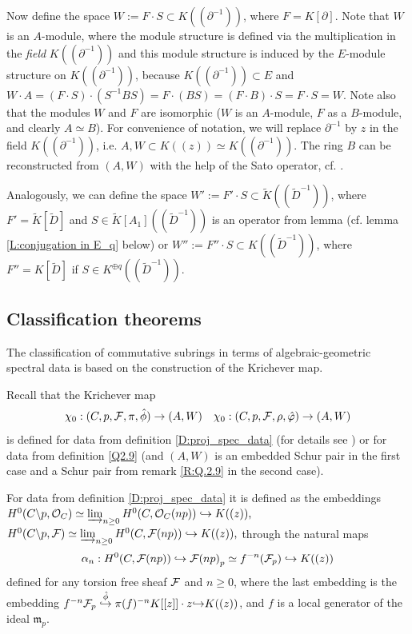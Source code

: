 \documentclass[11pt]{article}
\theoremstyle{definition}
\newcommand\limind{\mathop{\underrightarrow{\lim}}}
\newcommand{\idm}{\mathfrak{m}}
\theoremstyle{plain}
\numberwithin{equation}{section}
\newcommand{\co}{{{\cal O}}}
\newcommand{\cf}{{{\cal F}}}
\begin{document}
Now define the space $W:= F\cdot S \subset K((\partial^{-1}))$, where $F=K[\partial ]$. Note that $W$ is an $A$-module, where the module structure is defined via the multiplication in the {\it field} $K((\partial^{-1}))$ and this module structure is induced by the $E$-module structure on $K((\partial^{-1}))$, because $K((\partial^{-1}))\subset E$ and $W\cdot A=(F\cdot S)\cdot (S^{-1}BS)=F\cdot (BS)=(F\cdot B)\cdot S= F\cdot S= W$. 
Note also that the modules $W$ and $F$ are isomorphic ($W$ is an $A$-module, $F$ as a $B$-module, and clearly $A\simeq B$). For convenience of notation, we will replace $\partial^{-1}$ by $z$ in the field $K((\partial^{-1}))$, i.e. $A,W\subset K((z))\simeq K((\partial^{-1}))$. The ring $B$ can be reconstructed from $(A,W)$ with the help of the Sato operator, cf. \cite{Mu}. 

Analogously, we can define the space $W':=F'\cdot S\subset \tilde{K}((\tilde{D}^{-1}))$, where $F'=\tilde{K}[\tilde{D}]$ and $S\in \tilde{K}[A_1]((\tilde{D}^{-1}))$ is an operator from lemma \cite[Lem. 3.3]{GZ24} (cf. lemma \ref{L:conjugation in E_q} below) or $W'':=F''\cdot S\subset K((\tilde{D}^{-1}))$, where $F''=K[\tilde{D}]$ if $S\in K^{\oplus q}((\tilde{D}^{-1}))$. 




\subsection{Classification theorems}
\label{S:classif_thms}

The classification of commutative subrings in terms of algebraic-geometric spectral data is based on the construction of the Krichever map. 

Recall that the Krichever map 
$$
\chi_0:(C,p,\cf ,\pi , \hat{\phi} ) \rightarrow (A,W) \quad \chi_0:(C,p,\cf ,\rho , \hat{\varphi} ) \rightarrow (A,W)
$$
is defined for data from definition \ref{D:proj_spec_data} (for details see \cite[Ch.10]{Zheglov_book}) or for data from definition \ref{Q2.9} (and $(A,W)$ is an embedded Schur pair in the first case and a Schur pair from remark \ref{R:Q.2.9} in the second case). 

For data from definition \ref{D:proj_spec_data} it is defined as the embeddings 
$H^0(C\backslash p, \co_C )\simeq \limind_{n\ge 0} H^0(C, \co_C (np)) \hookrightarrow K((z)) \mbox{,}$
$H^0(C\backslash p, \cf )\simeq \limind_{n\ge 0} H^0(C, \cf (np)) \hookrightarrow K((z)) \mbox{,}$ 
through the natural maps
$$
\alpha_n: H^0(C, \cf (np))\hookrightarrow {\cf (np)}_p\simeq f^{-n} ({\cf }_p) \hookrightarrow K((z)) 
$$
defined for any torsion free sheaf $\cf$ and $n\ge 0$, where the last embedding is the embedding $f^{-n}{\cf }_p \stackrel{\hat{\phi} }{\hookrightarrow } 
\pi (f)^{-n} K[[z]]\cdot z {\hookrightarrow} K((z))$, and $f$ is a local generator of the ideal $\idm_p$.
\end{document}

